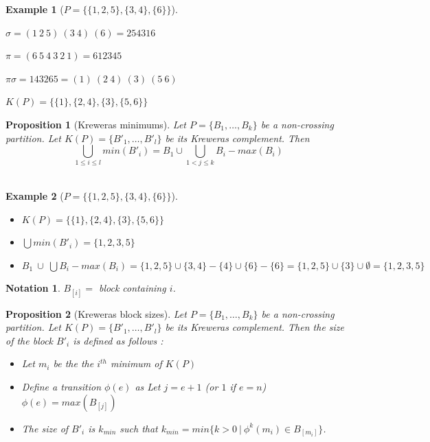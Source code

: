 \documentclass[12pt]{report}
\newtheorem*{prop}{Proposition}
\newtheorem*{example}{Example}
\newtheorem*{notation}{Notation}
\begin{document}
\begin{example}[$P = \{\{1, 2, 5\}, \{3, 4\}, \{6\}\}$]
    ~\\
    \begin{itemize*}
        \item $\sigma = (1\ 2\ 5)\ (3\ 4)\ (6) = 254316$\\
        \item $\pi = (6\ 5\ 4\ 3\ 2\ 1) = 612345$\\
        \item $\pi \sigma = 143265 = (1)\ (2\ 4)\ (3)\ (5\ 6)$\\
        \item $K(P) = \{\{1\},\{2, 4\}, \{3\}, \{5, 6\}\}$\\
    \end{itemize*}
\end{example}

\begin{prop}[Kreweras minimums]
        Let $P = \{B_1, \ldots, B_k\}$ be a non-crossing partition.
        Let $K (P) = \{B'_1, \ldots, B'_l\}$ be its Kreweras complement.
        Then $$\bigcup_{1 \leq i \leq l}{min (B'_i)} =
        B_1 \cup \bigcup_{1 < j \leq k}{B_i - {max (B_i)}}$$\\
\end{prop}

\begin{example}[$P = \{\{1, 2, 5\}, \{3, 4\}, \{6\}\}$]
    ~\\
    \begin{itemize}
        \item $K (P) = \{\{1\},\{2, 4\}, \{3\}, \{5, 6\}\}$
        \item $\bigcup{min (B'_i)} = \{1, 2, 3, 5\}$
        \item $B_1\ \cup\ \bigcup{B_i - {max (B_i)}}
        = \{1, 2, 5\} \cup \{3, 4\} - \{4\} \cup \{6\} - \{6\}
        = \{1, 2, 5\} \cup \{3\} \cup \emptyset = \{1, 2, 3, 5\}$\\
    \end{itemize}
\end{example}

\begin{notation}
    $B_{[i]} = $ block containing $i$.
\end{notation}

\begin{prop}[Kreweras block sizes]
    Let $P = \{B_1, \ldots, B_k\}$ be a non-crossing partition.
    Let $K (P) = \{B'_1, \ldots, B'_l\}$ be its Kreweras complement.
    Then the size of the block $B'_i$ is defined as follows :
    \begin{itemize}
        \item Let $m_i$ be the the $i^{th}$ minimum of $K (P)$
        \item Define a \emph{transition} $\phi (e)$ as 
            \subitem Let $j = e + 1$ (or $1$ if $e = n$)
            \subitem $\phi(e) = max (B_{[j]})$
        \item The size of $B'_i$ is $k_{min}$ such that
        $k_{min} = min \{k > 0\ |\ \phi^k (m_i) \in B_{[m_i]}\}$.\\
    \end{itemize}
\end{prop}
\end{document}
